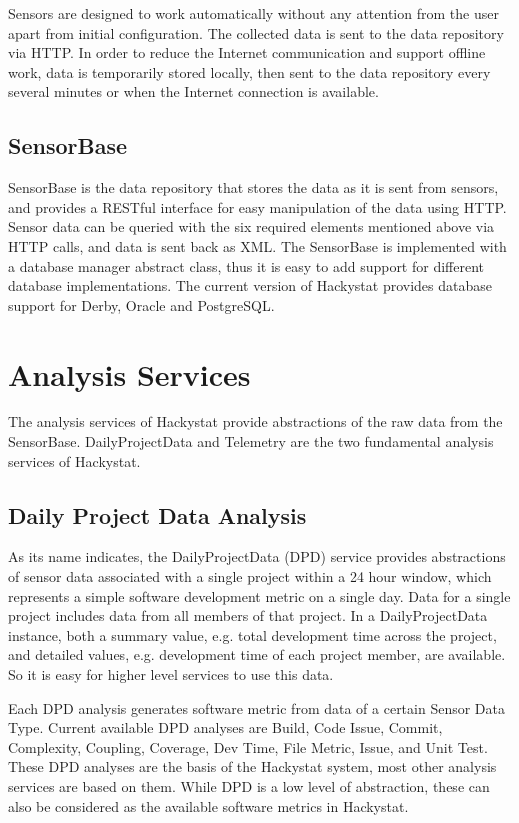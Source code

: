 Sensors are designed to work automatically without any attention from the user apart from initial configuration. The collected data is sent to the data repository via HTTP. In order to reduce the Internet communication and support offline work, data is temporarily stored locally, then sent to the data repository every several minutes or when the Internet connection is available.

\subsection{SensorBase}
SensorBase is the data repository that stores the data as it is sent from sensors, and provides a RESTful interface for easy manipulation of the data using HTTP. Sensor data can be queried with the six required elements mentioned above via HTTP calls, and data is sent back as XML. The SensorBase is implemented with a database manager abstract class, thus it is easy to add support for different database implementations. The current version of Hackystat provides database support for Derby, Oracle and PostgreSQL.

\section{Analysis Services}
The analysis services of Hackystat provide abstractions of the raw data from the SensorBase. DailyProjectData and Telemetry are the two fundamental analysis services of Hackystat.

\subsection{Daily Project Data Analysis}
As its name indicates, the DailyProjectData (DPD) service provides abstractions of sensor data associated with a single project within a 24 hour window, which represents a simple software development metric on a single day. Data for a single project includes data from all members of that project. In a DailyProjectData instance, both a summary value, e.g. total development time across the project, and detailed values, e.g. development time of each project member, are available. So it is easy for higher level services to use this data.

Each DPD analysis generates software metric from data of a certain Sensor Data Type. Current available DPD analyses are Build, Code Issue, Commit, Complexity, Coupling, Coverage, Dev Time, File Metric, Issue, and Unit Test. These DPD analyses are the basis of the Hackystat system, most other analysis services are based on them. While DPD is a low level of abstraction, these can also be considered as the available software metrics in Hackystat.

